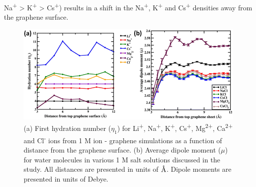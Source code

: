 Na\textsuperscript{+} > K\textsuperscript{+} > Cs\textsuperscript{+}) results in a shift in the Na\textsuperscript{+}, K\textsuperscript{+} and Cs\textsuperscript{+} densities away from the graphene surface.

\begin{figure}
    \centering
    \includegraphics[width=\textwidth]{Chapter3/Figures/Figure7.png}
    \caption[First hydration number ($\eta_1$) for Li\textsuperscript{+}, Na\textsuperscript{+}, K\textsuperscript{+}, Cs\textsuperscript{+}, Mg\textsuperscript{2+}, Ca\textsuperscript{2+} and Cl\textsuperscript{-} ions from 1 M ion - graphene simulations as a function of distance from the graphene surface. Average dipole moment ($\mu$) for water molecules in various 1 M salt solutions discussed in the study are also presented]{(a) First hydration number ($\eta_1$) for Li\textsuperscript{+}, Na\textsuperscript{+}, K\textsuperscript{+}, Cs\textsuperscript{+}, Mg\textsuperscript{2+}, Ca\textsuperscript{2+} and Cl\textsuperscript{-} ions from 1 M ion - graphene simulations as a function of distance from the graphene surface. (b) Average dipole moment ($\mu$) for water molecules in various 1 M salt solutions discussed in the study. All distances are presented in units of $\text{\normalfont\AA}$. Dipole moments are presented in units of Debye.}
\end{figure}


